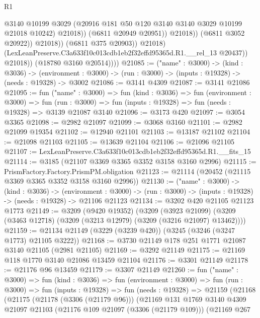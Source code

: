 \begin{lexlean}{R1}
\begin{coremodule}
                                    @3140
                                    @10199
                                    @3029
                                    (@20916 @181 @50 @120 @3140 @3140 @3029 @10199 @21018 @10242)
                                    @21018))
                                (@6811 @20949 @20951))
                              @21018))
                          (@6811 @3052 @20922))
                        @21018))
                    (@6811 @375 @20903))
                  @21018)
                (LexLeanPreserve.C3a633f10c013cdb1eb2f32effd95365d.R1.__rel_13 @20437))
              @21018))
          (@18780 @3160 @20514))))
@21085 := ("name" : @3000) ->
  (kind : @3036) ->
  (environment : @3000) -> (run : @3000) -> (inputs : @19328) -> (needs : @19328) -> @3002
@21086 := @3141 @4309
@21087 := @3141 @21086
@21095 := fun ("name" : @3000) =>
  fun (kind : @3036) =>
  fun (environment : @3000) =>
  fun (run : @3000) => fun (inputs : @19328) => fun (needs : @19328) => @3139 @21087 @3140
@21096 := @3173 @420
@21097 := @3054 @3365
@21098 := @2982 @21097
@21099 := @3068 @3160
@21101 := @2982 @21099 @19354
@21102 := @12940 @21101
@21103 := @13187 @21102
@21104 := @21098 @21103
@21105 := @13639 @21104
@21106 := @21096 @21105
@21107 := LexLeanPreserve.C3a633f10c013cdb1eb2f32effd95365d.R1.__fits_15
@21114 := @3185 (@21107 @3369 @3365 @3352 @3158 @3160 @2996)
@21115 := PrismFactory.Factory.PrismPM.obligation
@21123 := @21114 (@20452 (@21115 @3369 @3365 @3352 @3158 @3160 @2996))
@21130 := ("name" : @3000) ->
  (kind : @3036) ->
  (environment : @3000) -> (run : @3000) -> (inputs : @19328) -> (needs : @19328) -> @21106 @21123
@21134 := @3202 @420 @21105 @21123 @1773
@21149 := @3209
    (@9420 @19352)
    (@3209
      (@3923 @21099)
      (@3209 (@3463 @12718) (@3209 (@3213 @12979) (@3209 (@3216 @21097) @13462))))
@21159 := @21134 @21149 (@3229 (@3239 @420)) (@3245 (@3246 (@3247 @1773) @21105 @3222))
@21168 := @3730 @21149 @178 @251 @1771 @21087 @3140 @21105 (@2981 @21105)
@21169 := @3292 @21149
@21175 := @21169 @118 @1770 @3140 @21086 @13459 @21104
@21176 := @3301 @21149
@21178 := @21176 @96 @13459
@21179 := @3307 @21149
@21260 := fun ("name" : @3000) =>
  fun (kind : @3036) =>
  fun (environment : @3000) =>
  fun (run : @3000) =>
  fun (inputs : @19328) =>
  fun (needs : @19328) =>
  @21159
    (@21168
      (@21175
        (@21178 (@3306 (@21179 @96)))
        (@21169
          @131
          @1769
          @3140
          @4309
          @21097
          @21103
          (@21176 @109 @21097 (@3306 (@21179 @109)))
          (@21169
            @267

\end{coremodule}
\end{lexlean}
